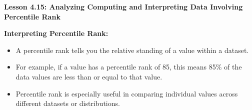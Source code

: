 \begin{center}
\textbf{Lesson 4.15: Analyzing Computing and Interpreting Data Involving Percentile Rank}
\end{center}

\vspace*{-1.5ex}

\noindent\textbf{Interpreting Percentile Rank:}  
\begin{itemize}
    \item A percentile rank tells you the relative standing of a value within a dataset.  
    \item For example, if a value has a percentile rank of 85, this means 85\% of the data values are less than or equal to that value.  
    \item Percentile rank is especially useful in comparing individual values across different datasets or distributions.  
\end{itemize}
